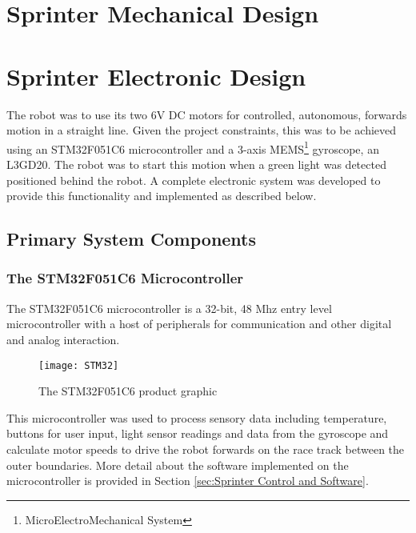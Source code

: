 \section{Sprinter Mechanical Design}
\label{sec:Sprinter Mechanical Design}

\clearpage
\section{Sprinter Electronic Design}
\label{sec:Sprinter Electronic Design}
  The robot was to use its two 6V DC motors for controlled, autonomous, forwards motion in a straight line. Given the project constraints, this was to be achieved using an STM32F051C6 microcontroller and a 3-axis MEMS\footnote{MicroElectroMechanical System} gyroscope, an L3GD20. The robot was to start this motion when a green light was detected positioned behind the robot. A complete electronic system was developed to provide this functionality and implemented as described below.

  \subsection{Primary System Components}
  \label{sub:Primary System Components}
    \subsubsection{The STM32F051C6 Microcontroller}
    \label{subs:The STM32F051C6 Microcontroller}
      The STM32F051C6 microcontroller is a 32-bit, 48 Mhz entry level microcontroller\textsuperscript{\cite{stm32f051c6Datasheet}} with a host of peripherals for communication and other digital and analog interaction.

      \begin{figure}[H]
        \begin{center}
          \texttt{[image: STM32]}
          \caption{The STM32F051C6 product graphic}
          \label{fig:STM32}
        \end{center}
      \end{figure}

      This microcontroller was used to process sensory data including temperature, buttons for user input, light sensor readings and data from the gyroscope and calculate motor speeds to drive the robot forwards on the race track between the outer boundaries. More detail about the software implemented on the microcontroller is provided in Section \ref{sec:Sprinter Control and Software}.


